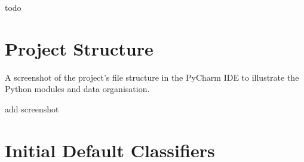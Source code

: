 \documentclass[letterpaper,12pt]{article}
\begin{document}
todo






\begin{appendices}

\clearpage





\clearpage
\section{Project Structure}
\label{sec:appendix-project-structure}

A screenshot of the project's file structure in the PyCharm IDE to illustrate the Python modules and data organisation.

add screenshot


\clearpage
\section{Initial Default Classifiers}
\label{sec:appendix-initial-default-classifiers}




\end{appendices}
\end{document}

